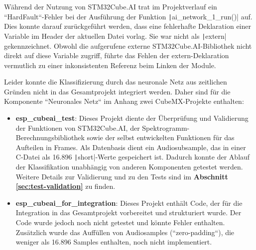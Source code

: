 Während der Nutzung von STM32Cube.AI trat im Projektverlauf ein ``HardFault``-Fehler bei der Ausführung der Funktion \texttt|ai_network_1_run()| auf. Dies konnte darauf zurückgeführt werden, dass eine fehlerhafte Deklaration einer Variable im Header der aktuellen Datei vorlag. Sie war nicht als \texttt|extern| gekennzeichnet. Obwohl die aufgerufene externe STM32Cube.AI-Bibliothek nicht direkt auf diese Variable zugriff, führte das Fehlen der extern-Deklaration vermutlich zu einer inkonsistenten Referenz beim Linken der Module.

Leider konnte die Klassifizierung durch das neuronale Netz aus zeitlichen Gründen nicht in das Gesamtprojekt integriert werden. Daher sind für die Komponente ``Neuronales Netz`` im Anhang zwei CubeMX-Projekte enthalten:

\begin{itemize}
\item \textbf{esp\_cubeai\_test}: Dieses Projekt diente der Überprüfung und Validierung der Funktionen von STM32Cube.AI, der Spektrogramm-Berechnungsbibliothek sowie der selbst entwickelten Funktionen für das Aufteilen in Frames. Als Datenbasis dient ein Audiosubsample, das in einer C-Datei als 16.896 \texttt|short|-Werte gespeichert ist. Dadurch konnte der Ablauf der Klassifikation unabhängig von anderen Komponenten getestet werden. Weitere Details zur Validierung und zu den Tests sind im \textbf{Abschnitt \ref{sec:test-validation}} zu finden.
\item \textbf{esp\_cubeai\_for\_integration}: Dieses Projekt enthält Code, der für die Integration in das Gesamtprojekt vorbereitet und strukturiert wurde. Der Code wurde jedoch noch nicht getestet und könnte Fehler enthalten. Zusätzlich wurde das Auffüllen von Audiosamples (``zero-padding``), die weniger als 16.896 Samples enthalten, noch nicht implementiert.
\end{itemize}
